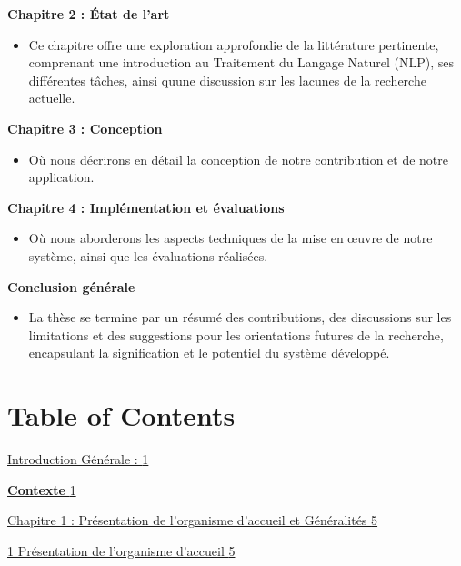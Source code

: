 \documentclass[
]{article}
\begin{document}
\textbf{Chapitre 2 : État de l'art}

\begin{itemize}
\item
  Ce chapitre offre une exploration approfondie de la littérature
  pertinente, comprenant une introduction au Traitement du Langage
  Naturel (NLP), ses différentes tâches, ainsi qu\textquotesingle une
  discussion sur les lacunes de la recherche actuelle.
\end{itemize}

\textbf{Chapitre 3 : Conception}

\begin{itemize}
\item
  Où nous décrirons en détail la conception de notre contribution et de
  notre application.
\end{itemize}

\textbf{Chapitre 4 : Implémentation et évaluations}

\begin{itemize}
\item
  Où nous aborderons les aspects techniques de la mise en œuvre de notre
  système, ainsi que les évaluations réalisées.
\end{itemize}

\textbf{Conclusion générale}

\begin{itemize}
\item
  La thèse se termine par un résumé des contributions, des discussions
  sur les limitations et des suggestions pour les orientations futures
  de la recherche, encapsulant la signification et le potentiel du
  système développé.
\end{itemize}

\section{Table of Contents}\label{table-of-contents}

\hyperref[liste-des-acronymes]{Introduction Générale :
\hyperref[liste-des-acronymes]{1}}

\hyperref[contexte]{\textbf{Contexte} \hyperref[contexte]{1}}

\hyperref[chapitre-1-pruxe9sentation-de-lorganisme-daccueil-et-guxe9nuxe9ralituxe9s]{Chapitre
1 : Présentation de l'organisme d'accueil et Généralités
\hyperref[chapitre-1-pruxe9sentation-de-lorganisme-daccueil-et-guxe9nuxe9ralituxe9s]{5}}

\hyperref[pruxe9sentation-de-lorganisme-daccueil]{1 Présentation de
l'organisme d'accueil
\hyperref[pruxe9sentation-de-lorganisme-daccueil]{5}}
\end{document}
